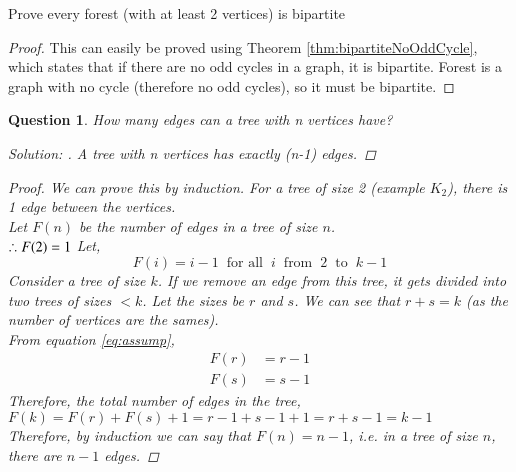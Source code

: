 \documentclass{article}
\newtheorem{question}{Question}
\begin{document}
\begin{theorem}
    Prove every forest (with at least 2 vertices) is bipartite
    \begin{proof}
        This can easily be proved using Theorem \ref{thm:bipartiteNoOddCycle}, which states that if there are no odd cycles in a graph, it is bipartite. Forest is a graph with no cycle (therefore no odd cycles), so it must be bipartite.
    \end{proof}
\end{theorem}

\begin{question}
    How many edges can a tree with n vertices have?
    \begin{proof}[Solution: ]\let\qed\relax
        A tree with n vertices has exactly (n-1) edges.       
    \end{proof}
    \begin{proof}
        We can prove this by induction. For a tree of size 2 (example $K_{2}$), there is 1 edge between the vertices.\\
        Let $F(n)$ be the number of edges in a tree of size $n$.\\
        $\therefore F(2) = 1\\$
        Let,\\
        \begin{equation}
            \label{eq:assump}
            F(i) = i-1 \phantom{x}\text{for all}\phantom{x} i\phantom{x} \text{from}\phantom{x} 2\phantom{x} \text{to}\phantom{x} k-1
        \end{equation}
        Consider a tree of size $k$. If we remove an edge from this tree, it gets divided into two trees of sizes $<k$. Let the sizes be $r$ and $s$. We can see that $r+s = k$ (as the number of vertices are the sames).\\
        From equation \ref{eq:assump},
        \begin{align*}
            F(r) &= r-1\\
            F(s) &= s-1
        \end{align*}
        Therefore, the total number of edges in the tree, $F(k) = F(r) + F(s) + 1 = r - 1 + s - 1 + 1 = r + s - 1 = k-1$\\
        Therefore, by induction we can say that $F(n)=n-1$, i.e. in a tree of size $n$, there are $n-1$ edges.
    \end{proof}
\end{question}
\end{document}
